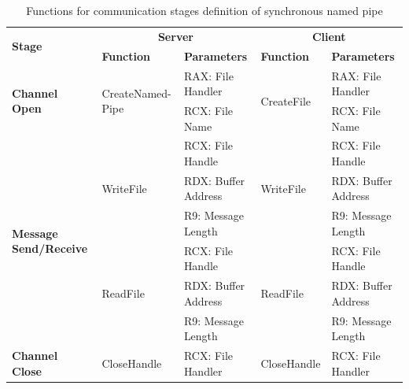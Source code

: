     \begin{table}[h]
        \centering
        \caption{Functions for communication stages definition of synchronous named pipe}
        \label{synfunctions}
        \begin{tabular}{|p{1.8cm}|l|l|l|l|}
            \hline
             \multirow{2}{*}{\textbf{Stage}} &
               \multicolumn{2}{c|}{\textbf{Server}} &
               \multicolumn{2}{c|}{\textbf{Client}} \\
             \cline{2-5}
              & \textbf{Function}& \textbf{Parameters} & \textbf{Function} & \textbf{Parameters}  \\
             \hline
             \multirow{2}{*}{\parbox{1.8cm}{\textbf{Channel Open}}}
             &\multirow{2}{*}{\parbox{2.5cm}{CreateNamed- Pipe}} &  RAX: File Handler & \multirow{2}{*}{CreateFile} &  RAX: File Handler\\
              \cline{3-3} \cline{5-5}
             &&  RCX: File Name &  &  RCX: File Name\\
            \hline
             \multirow{6}{*}{\parbox{1.8cm}{\textbf{Message Send/Receive}}}
             &\multirow{3}{*}{WriteFile} &  RCX: File Handle & \multirow{3}{*}{WriteFile} &  RCX: File Handle\\
              \cline{3-3} \cline{5-5}
             &&  RDX: Buffer Address &  &  RDX: Buffer Address\\
                           \cline{3-3} \cline{5-5}
             & &  R9: Message Length &  &  R9: Message Length\\
            \cline{2-5}
             & \multirow{3}{*}{ReadFile}&  RCX: File Handle & \multirow{3}{*}{ReadFile} &  RCX: File Handle\\
              \cline{3-3} \cline{5-5}
              &&  RDX: Buffer Address &  &  RDX: Buffer Address\\
                           \cline{3-3} \cline{5-5}
             & &  R9: Message Length &  &  R9: Message Length\\
            \hline
           \multirow{2}{*}{\parbox{1.8cm}{\textbf{Channel Close}}}
             &\multirow{2}{*}{CloseHandle} & \multirow{2}{*}{RCX: File Handler} & \multirow{2}{*}{CloseHandle} &  \multirow{2}{*}{RCX: File Handler}\\
             &&   &  & \\
            \hline
        \end{tabular}
    \end{table}
